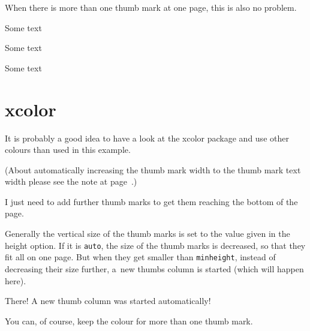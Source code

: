 \documentclass[twoside,british]{article}[2007/10/19]%
\begin{document}


\bigskip

When there is more than one thumb mark at one page, this is also no problem.

\newpage

Some text

\newpage

Some text

\newpage

Some text

\newpage

\section{xcolor}

It is probably a good idea to have a look at the \textsf{xcolor} package
and use other colours than used in this example.

(About automatically increasing the thumb mark width to the thumb mark text
width please see the note at page~\pageref{HugeText}.)

\newpage


I just need to add further thumb marks to get them reaching the bottom of the page.

Generally the vertical size of the thumb marks is set to the value given in the
height option. If it is \texttt{auto}, the size of the thumb marks is decreased,
so that they fit all on one page. But when they get smaller than \texttt{minheight},
instead of decreasing their size further, a~new thumbs column is started
(which will happen here).

\newpage


There! A new thumb column was started automatically!

\newpage


You can, of course, keep the colour for more than one thumb mark.

\newpage

\end{document}
